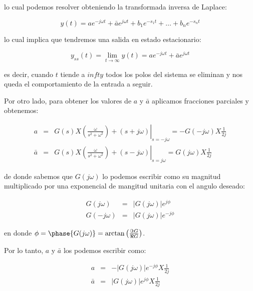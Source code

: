     lo cual podemos resolver obteniendo la transformada inversa de Laplace:

    \begin{equation*}
        y(t) = a e^{-j \omega t} + \bar{a} e^{j \omega t} + b_1 e^{-s_1 t} + \dots + b_n e^{-s_n t}
    \end{equation*}

    lo cual implica que tendremos una salida en estado estacionario:

    \begin{equation*}
        y_{ss}(t) = \lim_{t \to \infty} y(t) = a e^{-j \omega t} + \bar{a} e ^{j \omega t}
    \end{equation*}

    es decir, cuando $t$ tiende a $infty$ todos los polos del sistema se eliminan y nos queda el comportamiento de la entrada a seguir.

    Por otro lado, para obtener los valores de $a$ y $\bar{a}$ aplicamos fracciones parciales y obtenemos:

    \begin{eqnarray*}
        a & = & \left. G(s) X \left( \frac{\omega}{s^2 + \omega^2} \right) + (s + j \omega) \right|_{s=-j \omega} = - G(-j \omega) X \frac{1}{2j} \\
        \bar{a} & = & \left. G(s) X \left( \frac{\omega}{s^2 + \omega^2} \right) + (s - j \omega) \right|_{s=j \omega} = G(j \omega) X \frac{1}{2j}
    \end{eqnarray*}

    de donde sabemos que $G(j \omega)$ lo podemos escribir como su magnitud multiplicado por una exponencial de mangitud unitaria con el angulo deseado:

    \begin{eqnarray*}
        G(j \omega) & = & \left| G(j \omega) \right| e^{j \phi} \\
        G(-j \omega) & = & \left| G(j \omega) \right| e^{-j \phi}
    \end{eqnarray*}

    en donde $\phi = \phase{G(j \omega)} = \arctan{\left( \frac{\Im{G}}{\Re{G}} \right)}$.

    Por lo tanto, $a$ y $\bar{a}$ los podemos escribir como:

    \begin{eqnarray*}
        a & = & - \left| G(j \omega) \right| e^{-j \phi} X \frac{1}{2j} \\
        \bar{a} & = & \left| G(j \omega) \right| e^{j \phi} X \frac{1}{2j}
    \end{eqnarray*}

